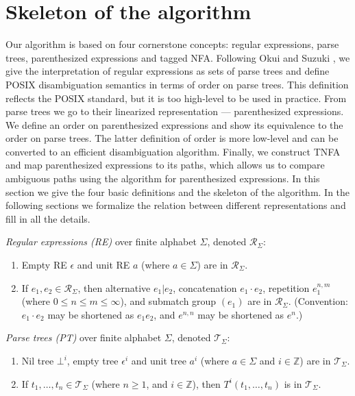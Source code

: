 \documentclass[AMA,STIX1COL]{WileyNJD-v2}
\newcommand{\XR}{\mathcal{R}}
\newcommand{\XT}{\mathcal{T}}
\newcommand{\YZ}{\mathbb{Z}}
\begin{document}
\section{Skeleton of the algorithm}\label{section_main}

Our algorithm is based on four cornerstone concepts:
regular expressions, parse trees, parenthesized expressions and tagged NFA.
%
Following Okui and Suzuki \cite{OS13}, we give the interpretation of regular expressions as sets of parse trees
and define POSIX disambiguation semantics in terms of order on parse trees.
This definition reflects the POSIX standard, but it is too high-level to be used in practice.
%
From parse trees we go to their linearized representation --- parenthesized expressions.
We define an order on parenthesized expressions and show its equivalence to the order on parse trees.
The latter definition of order is more low-level and can be converted to an efficient disambiguation algorithm.
%
Finally, we construct TNFA and map parenthesized expressions to its paths,
which allows us to compare ambiguous paths using the algorithm for parenthesized expressions.
%
In this section we give the four basic definitions and the skeleton of the algorithm.
In the following sections we formalize the relation between different representations and fill in all the details.

    \begin{definition}
    \emph{Regular expressions (RE)} over finite alphabet $\Sigma$, denoted $\XR_\Sigma$:
    \begin{enumerate}
        \item
          Empty RE $\epsilon$ and
          unit RE $a$ (where $a \in \Sigma$) are in $\XR_\Sigma$.
        \item If $e_1, e_2 \in \XR_\Sigma$, then
          alternative $e_1 | e_2$,
          concatenation $e_1 \cdot e_2$,
          repetition $e_1^{n, m}$ (where $0 \leq n \leq m \leq \infty$), and
          submatch group $(e_1)$
          are in $\XR_\Sigma$.
          (Convention: $e_1 \cdot e_2$ may be shortened as $e_1 e_2$, and $e^{n,n}$ may be shortened as $e^n$.)
    \end{enumerate}
    \end{definition}


    \begin{definition}
    \emph{Parse trees (PT)} over finite alphabet $\Sigma$, denoted $\XT_\Sigma$:
    \begin{enumerate}
        \item
          Nil tree ${\bot}^i$,
          empty tree ${\epsilon}^i$ and
          unit tree $a^i$ (where $a \in \Sigma$ and $i \in \YZ$)
          are in $\XT_\Sigma$.
        \item If $t_1, \dots, t_n \in \XT_\Sigma$ (where $n \geq 1$, and $i \in \YZ$), then
          ${T}^i(t_1, \dots, t_n)$
          is in $\XT_\Sigma$.
    \end{enumerate}
    \end{definition}
\end{document}

